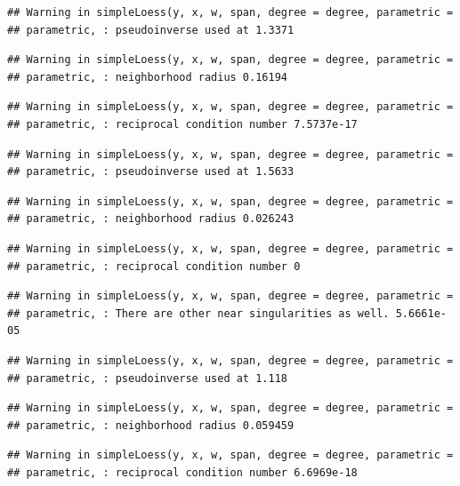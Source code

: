 \documentclass[]{article}
\begin{document}
\begin{verbatim}
## Warning in simpleLoess(y, x, w, span, degree = degree, parametric =
## parametric, : pseudoinverse used at 1.3371
\end{verbatim}

\begin{verbatim}
## Warning in simpleLoess(y, x, w, span, degree = degree, parametric =
## parametric, : neighborhood radius 0.16194
\end{verbatim}

\begin{verbatim}
## Warning in simpleLoess(y, x, w, span, degree = degree, parametric =
## parametric, : reciprocal condition number 7.5737e-17
\end{verbatim}

\begin{verbatim}
## Warning in simpleLoess(y, x, w, span, degree = degree, parametric =
## parametric, : pseudoinverse used at 1.5633
\end{verbatim}

\begin{verbatim}
## Warning in simpleLoess(y, x, w, span, degree = degree, parametric =
## parametric, : neighborhood radius 0.026243
\end{verbatim}

\begin{verbatim}
## Warning in simpleLoess(y, x, w, span, degree = degree, parametric =
## parametric, : reciprocal condition number 0
\end{verbatim}

\begin{verbatim}
## Warning in simpleLoess(y, x, w, span, degree = degree, parametric =
## parametric, : There are other near singularities as well. 5.6661e-05
\end{verbatim}

\begin{verbatim}
## Warning in simpleLoess(y, x, w, span, degree = degree, parametric =
## parametric, : pseudoinverse used at 1.118
\end{verbatim}

\begin{verbatim}
## Warning in simpleLoess(y, x, w, span, degree = degree, parametric =
## parametric, : neighborhood radius 0.059459
\end{verbatim}

\begin{verbatim}
## Warning in simpleLoess(y, x, w, span, degree = degree, parametric =
## parametric, : reciprocal condition number 6.6969e-18
\end{verbatim}
\end{document}
